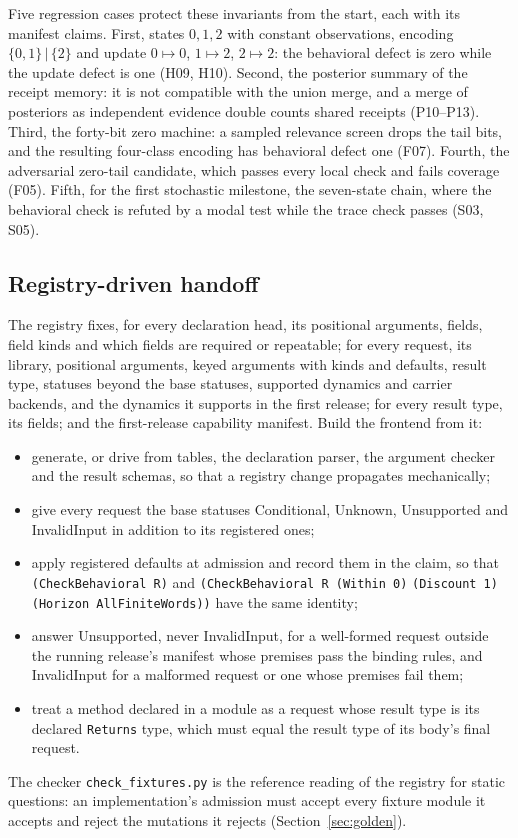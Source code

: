 \documentclass[11pt]{article}
\newcommand{\code}[1]{\texttt{#1}}
\begin{document}
Five regression cases protect these invariants from the start, each with its manifest claims. First,
states $0,1,2$ with constant observations, encoding $\{0,1\}\,|\,\{2\}$ and update $0\mapsto0$,
$1\mapsto2$, $2\mapsto2$: the behavioral defect is zero while the update defect is one (H09, H10).
Second, the posterior summary of the receipt memory: it is not compatible with the union merge, and a
merge of posteriors as independent evidence double counts shared receipts (P10--P13). Third, the
forty-bit zero machine: a sampled relevance screen drops the tail bits, and the resulting four-class
encoding has behavioral defect one (F07). Fourth, the adversarial zero-tail candidate, which passes
every local check and fails coverage (F05). Fifth, for the first stochastic milestone, the
seven-state chain, where the behavioral check is refuted by a modal test while the trace check passes
(S03, S05).

\subsection{Registry-driven handoff}\label{sec:registry}

The registry fixes, for every declaration head, its positional arguments, fields, field kinds and
which fields are required or repeatable; for every request, its library, positional arguments,
keyed arguments with kinds and defaults, result type, statuses beyond the base statuses, supported
dynamics and carrier backends, and the dynamics it supports in the first release; for every result
type, its fields; and the first-release capability manifest. Build the frontend from it:
\begin{itemize}
\item generate, or drive from tables, the declaration parser, the argument checker and the result
schemas, so that a registry change propagates mechanically;
\item give every request the base statuses Conditional, Unknown, Unsupported and InvalidInput in
addition to its registered ones;
\item apply registered defaults at admission and record them in the claim, so that
\code{(CheckBehavioral R)} and \code{(CheckBehavioral R (Within 0)} \code{(Discount 1) (Horizon AllFiniteWords))}
have the same identity;
\item answer Unsupported, never InvalidInput, for a well-formed request outside the running release's
manifest whose premises pass the binding rules, and InvalidInput for a malformed request or one whose
premises fail them;
\item treat a method declared in a module as a request whose result type is its declared
\code{Returns} type, which must equal the result type of its body's final request.
\end{itemize}
The checker \code{check\_fixtures.py} is the reference reading of the registry for static questions:
an implementation's admission must accept every fixture module it accepts and reject the mutations
it rejects (Section~\ref{sec:golden}).
\end{document}
